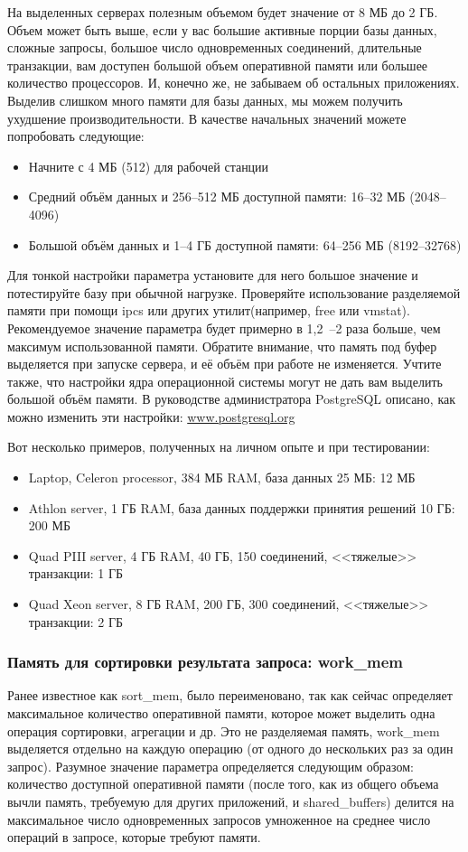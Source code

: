 На выделенных серверах полезным объемом будет значение от 8 МБ до 2 ГБ.
Объем может быть выше, если у вас большие активные порции базы данных, сложные запросы, большое число
одновременных соединений, длительные транзакции, вам доступен большой объем оперативной памяти или большее количество
процессоров. И, конечно же, не забываем об остальных приложениях. Выделив слишком много памяти для базы данных,
мы можем получить ухудшение производительности.
В качестве начальных значений можете попробовать следующие:
\begin{itemize}
\item Начните с 4 МБ (512) для рабочей станции
\item Средний объём данных и 256--512 МБ доступной памяти: 16--32 МБ (2048--4096)
\item Большой объём данных и 1--4 ГБ доступной памяти: 64--256 МБ (8192--32768)
\end{itemize}

Для тонкой настройки параметра установите для него большое значение и потестируйте базу при обычной нагрузке.
Проверяйте использование разделяемой памяти при помощи ipcs или других утилит(например, free или vmstat).
Рекомендуемое значение параметра
будет примерно в 1,2~--2 раза больше, чем максимум использованной памяти. Обратите внимание, что память под буфер
выделяется при запуске сервера, и её объём при работе не изменяется. Учтите также, что настройки ядра операционной
системы могут не дать вам выделить большой объём памяти. В руководстве администратора PostgreSQL описано, как
можно изменить эти настройки: \href{http://www.postgresql.org/docs/devel/static/kernel-resources.html}{www.postgresql.org}

Вот несколько примеров, полученных на личном опыте и при тестировании:
\begin{itemize}
\item Laptop, Celeron processor, 384 МБ RAM, база данных 25 МБ: 12 МБ
\item Athlon server, 1 ГБ RAM, база данных поддержки принятия решений 10 ГБ: 200 МБ
\item Quad PIII server, 4 ГБ RAM, 40 ГБ, 150 соединений, <<тяжелые>> транзакции: 1 ГБ
\item Quad Xeon server, 8 ГБ RAM, 200 ГБ, 300 соединений, <<тяжелые>> транзакции: 2 ГБ
\end{itemize}

\subsubsection{Память для сортировки результата запроса: work\_mem}
Ранее известное как sort\_mem, было переименовано, так как сейчас определяет максимальное количество оперативной памяти,
которое может выделить одна операция сортировки, агрегации и др. Это не разделяемая память, work\_mem выделяется отдельно
на каждую операцию (от одного до нескольких раз за один запрос). Разумное значение параметра определяется следующим образом:
количество доступной оперативной памяти (после того, как из общего объема вычли память, требуемую для других приложений, и
shared\_buffers) делится на максимальное число одновременных запросов умноженное на среднее число операций в запросе, которые
требуют памяти.

